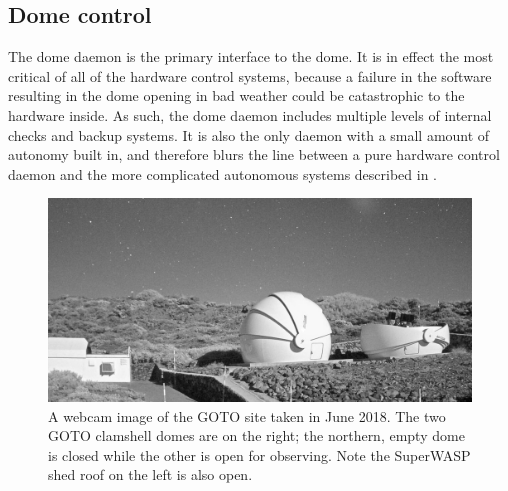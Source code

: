 \subsection{Dome control}
\label{sec:dome}
\begin{colsection}

The dome daemon is the primary interface to the dome. It is in effect the most critical of all of the hardware control systems, because a failure in the software resulting in the dome opening in bad weather could be catastrophic to the hardware inside. As such, the dome daemon includes multiple levels of internal checks and backup systems. It is also the only daemon with a small amount of autonomy built in, and therefore blurs the line between a pure hardware control daemon and the more complicated autonomous systems described in .

\begin{figure}[t]
    \begin{center}
        \includegraphics[width=\linewidth]{images/webcam_open.jpeg}
    \end{center}
    \caption[Webcam image of the GOTO site at night]{
        A webcam image of the GOTO site taken in June 2018. The two GOTO clamshell domes are on the right; the northern, empty dome is closed while the other is open for observing. Note the SuperWASP shed roof on the left is also open.
    }\label{fig:webcam}
\end{figure}


\end{colsection}
